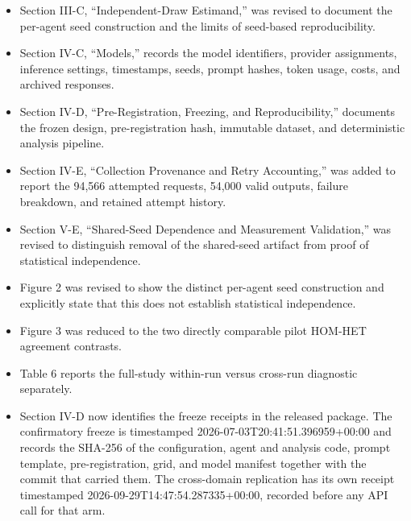 \documentclass[11pt]{article}
\begin{document}
\begin{itemize}

\item Section III-C, ``Independent-Draw Estimand,'' was revised to document the per-agent seed construction and the limits of seed-based reproducibility.

\item Section IV-C, ``Models,'' records the model identifiers, provider assignments, inference settings, timestamps, seeds, prompt hashes, token usage, costs, and archived responses.

\item Section IV-D, ``Pre-Registration, Freezing, and Reproducibility,'' documents the frozen design, pre-registration hash, immutable dataset, and deterministic analysis pipeline.

\item Section IV-E, ``Collection Provenance and Retry Accounting,'' was added to report the 94,566 attempted requests, 54,000 valid outputs, failure breakdown, and retained attempt history.

\item Section V-E, ``Shared-Seed Dependence and Measurement Validation,'' was revised to distinguish removal of the shared-seed artifact from proof of statistical independence.

\item Figure 2 was revised to show the distinct per-agent seed construction and explicitly state that this does not establish statistical independence.

\item Figure 3 was reduced to the two directly comparable pilot HOM-HET agreement contrasts.

\item Table 6 reports the full-study within-run versus cross-run diagnostic separately.

\item Section IV-D now identifies the freeze receipts in the released package. The confirmatory freeze is timestamped 2026-07-03T20:41:51.396959+00:00 and records the SHA-256 of the configuration, agent and analysis code, prompt template, pre-registration, grid, and model manifest together with the commit that carried them. The cross-domain replication has its own receipt timestamped 2026-09-29T14:47:54.287335+00:00, recorded before any API call for that arm.

\end{itemize}
\end{document}
